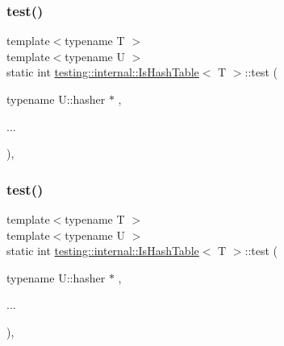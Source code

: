 \mbox{\label{structtesting_1_1internal_1_1_is_hash_table_a195b49a6ae5090b6266a5fa4ab771962}} 
\subsubsection{\texorpdfstring{test()}{test()}\hspace{0.1cm}{\footnotesize\ttfamily [3/9]}}
{\footnotesize\ttfamily template$<$typename T $>$ \\
template$<$typename U $>$ \\
static int \mbox{\hyperlink{structtesting_1_1internal_1_1_is_hash_table}{testing\+::internal\+::\+Is\+Hash\+Table}}$<$ T $>$\+::test (\begin{DoxyParamCaption}\item[{typename U\+::hasher $\ast$}]{,  }\item[{}]{... }\end{DoxyParamCaption})\hspace{0.3cm}{\ttfamily [static]}, {\ttfamily [private]}}

\mbox{\label{structtesting_1_1internal_1_1_is_hash_table_a195b49a6ae5090b6266a5fa4ab771962}} 
\subsubsection{\texorpdfstring{test()}{test()}\hspace{0.1cm}{\footnotesize\ttfamily [4/9]}}
{\footnotesize\ttfamily template$<$typename T $>$ \\
template$<$typename U $>$ \\
static int \mbox{\hyperlink{structtesting_1_1internal_1_1_is_hash_table}{testing\+::internal\+::\+Is\+Hash\+Table}}$<$ T $>$\+::test (\begin{DoxyParamCaption}\item[{typename U\+::hasher $\ast$}]{,  }\item[{}]{... }\end{DoxyParamCaption})\hspace{0.3cm}{\ttfamily [static]}, {\ttfamily [private]}}

